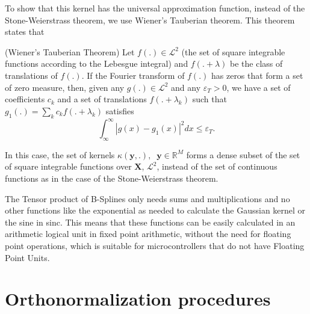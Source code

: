 To show that this kernel has the universal approximation function, instead of the Stone-Weierstrass theorem, we use Wiener's Tauberian theorem. This theorem states that \cite{wiener_tauberian_1932}
\begin{theorem}
    (Wiener's Tauberian Theorem) Let $f(.) \in \mathcal{L}^2$ (the set of square integrable functions according to the Lebesgue integral) and $f(.+\lambda)$ be the class of translations of $f(.)$. If the Fourier transform of $f(.)$ has zeros that form a set of zero measure, then, given any $g(.) \in \mathcal{L}^2$ and any $\varepsilon_T > 0$, we have a set of coefficients $c_k$ and a set of translations $f(.+\lambda_k)$ such that $g_1(.) = \sum_k c_kf(.+\lambda_k)$ satisfies 
    \begin{equation*}
        \int_{\infty}^{\infty}|g(x) - g_1(x)|^2dx \leq \varepsilon_T.
    \end{equation*}
\end{theorem}

In this case, the set of kernels $\kappa(\mathbf{y},.), \;\; \mathbf{y}\in \mathbb{R}^M$ forms a dense subset of the set of square integrable functions over $\mathbf{X}$, $\mathcal{L}^2$, instead of the set of continuous functions as in the case of the Stone-Weierstrass theorem.

The Tensor product of B-Splines only needs sums and multiplications and no other functions like the exponential as needed to calculate the Gaussian kernel or the sine in sinc. This means that these functions can be easily calculated in an arithmetic logical unit in fixed point arithmetic, without the need for floating point operations, which is suitable for microcontrollers that do not have Floating Point Units.

\section{Orthonormalization procedures}

